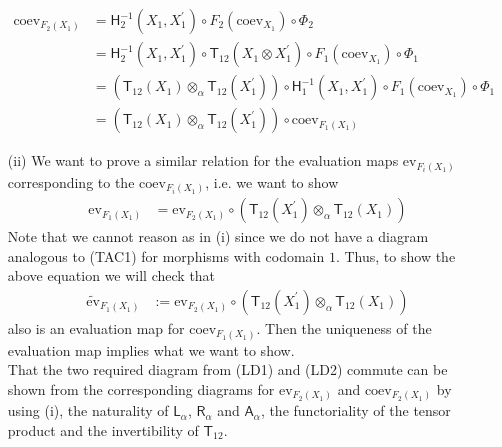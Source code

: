\begin{prf}[Sketch]
\begin{enumerate}
\begin{align*}
  \mathrm{coev}_{F_{2}(X_{1})}
  &=
  \mathsf{H}_{2}^{-1}(X_{1},X_{1}^{\prime})
  \circ
  F_{2}(\mathrm{coev}_{X_{1}})
  \circ
  \Phi_{2}
  \\
  &=
  \mathsf{H}_{2}^{-1}(X_{1},X_{1}^{\prime})
  \circ
  \mathsf{T}_{12}(X_{1} \otimes X_{1}^{\prime})
  \circ
  F_{1}(\mathrm{coev}_{X_{1}})
  \circ
  \Phi_{1}
  \\
  &=
  \left(
    \mathsf{T}_{12}(X_{1})
    \otimes_{\alpha}
    \mathsf{T}_{12}(X_{1}^{\prime})
  \right)
  \circ
  \mathsf{H}_{1}^{-1}(X_{1},X_{1}^{\prime})
  \circ
  F_{1}(\mathrm{coev}_{X_{1}})
  \circ
  \Phi_{1}
  \\
  &=
  \left(
    \mathsf{T}_{12}(X_{1})
    \otimes_{\alpha}
    \mathsf{T}_{12}(X_{1}^{\prime})
  \right)
  \circ
  \mathrm{coev}_{F_{1}(X_{1})}
\end{align*}

\item[(ii)]
We want to prove a similar relation for the evaluation maps $\mathrm{ev}_{F_{i}(X_{1})}$ corresponding to the $\mathrm{coev}_{F_{i}(X_{1})}$, i.e. we want to show
\begin{align*}
  \mathrm{ev}_{F_{1}(X_{1})}
  &=
  \mathrm{ev}_{F_{2}(X_{1})}
  \circ
  \left(
    \mathsf{T}_{12}(X_{1}^{\prime})
    \otimes_{\alpha}
    \mathsf{T}_{12}(X_{1})
  \right)
\end{align*}
Note that we cannot reason as in (i) since we do not have a diagram analogous to (TAC1) for morphisms with codomain $1$. Thus, to show the above equation we will check that
\begin{align*}
  \tilde{\mathrm{ev}}_{F_{1}(X_{1})}
  &:=
  \mathrm{ev}_{F_{2}(X_{1})}
  \circ
  \left(
    \mathsf{T}_{12}(X_{1}^{\prime})
    \otimes_{\alpha}
    \mathsf{T}_{12}(X_{1})
  \right)
\end{align*}
also is an evaluation map for $\mathrm{coev}_{F_{1}(X_{1})}$. Then the uniqueness of the evaluation map implies what we want to show.
\\
That the two required diagram from (LD1) and (LD2) commute can be shown from the corresponding diagrams for $\mathrm{ev}_{F_{2}(X_{1})}$ and $\mathrm{coev}_{F_{2}(X_{1})}$ by using (i), the naturality of $\mathsf{L}_{\alpha}$, $\mathsf{R}_{\alpha}$ and $\mathsf{A}_{\alpha}$, the functoriality of the tensor product and the invertibility of $\mathsf{T}_{12}$.


\end{enumerate}
\end{prf}
